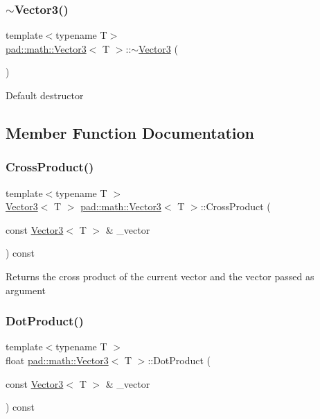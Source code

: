 \subsubsection{\texorpdfstring{$\sim$\+Vector3()}{~Vector3()}}
{\footnotesize\ttfamily template$<$typename T$>$ \\
\mbox{\hyperlink{structpad_1_1math_1_1_vector3}{pad\+::math\+::\+Vector3}}$<$ T $>$\+::$\sim$\mbox{\hyperlink{structpad_1_1math_1_1_vector3}{Vector3}} (\begin{DoxyParamCaption}{ }\end{DoxyParamCaption})\hspace{0.3cm}{\ttfamily [default]}}

Default destructor 

\subsection{Member Function Documentation}
\mbox{\label{structpad_1_1math_1_1_vector3_ac2e50febe3b0e838a515ad17017050c8}} 
\subsubsection{\texorpdfstring{Cross\+Product()}{CrossProduct()}}
{\footnotesize\ttfamily template$<$typename T $>$ \\
\mbox{\hyperlink{structpad_1_1math_1_1_vector3}{Vector3}}$<$ T $>$ \mbox{\hyperlink{structpad_1_1math_1_1_vector3}{pad\+::math\+::\+Vector3}}$<$ T $>$\+::Cross\+Product (\begin{DoxyParamCaption}\item[{const \mbox{\hyperlink{structpad_1_1math_1_1_vector3}{Vector3}}$<$ T $>$ \&}]{\+\_\+vector }\end{DoxyParamCaption}) const}

Returns the cross product of the current vector and the vector passed as argument \mbox{\label{structpad_1_1math_1_1_vector3_adf5f36332f64f4d6e90144e514e8c84c}} 
\subsubsection{\texorpdfstring{Dot\+Product()}{DotProduct()}}
{\footnotesize\ttfamily template$<$typename T $>$ \\
float \mbox{\hyperlink{structpad_1_1math_1_1_vector3}{pad\+::math\+::\+Vector3}}$<$ T $>$\+::Dot\+Product (\begin{DoxyParamCaption}\item[{const \mbox{\hyperlink{structpad_1_1math_1_1_vector3}{Vector3}}$<$ T $>$ \&}]{\+\_\+vector }\end{DoxyParamCaption}) const}

